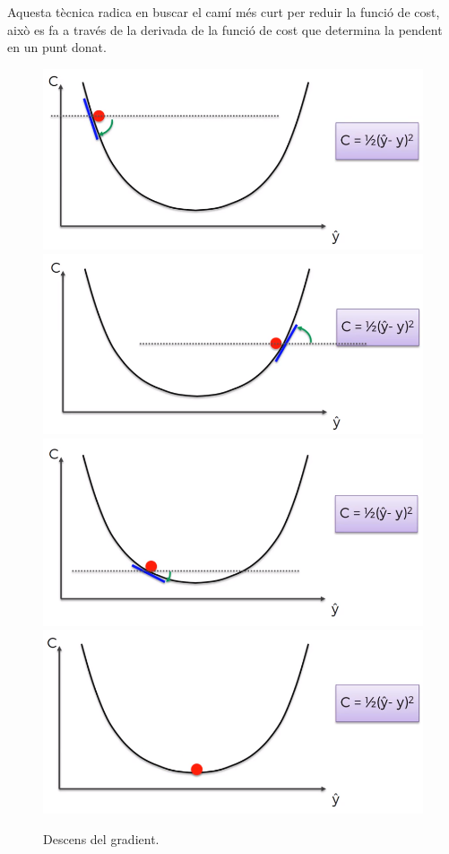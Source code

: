 \documentclass[12pt]{article}
\begin{document}
\\\\Aquesta tècnica radica en buscar el camí més curt per reduir la funció de cost, això es fa a través de la derivada de la funció de cost que determina la pendent en un punt donat.
\begin{figure}[h!]
	\includegraphics[scale=0.25]{imatges/dg/2dg2.png}
	\includegraphics[scale=0.25]{imatges/dg/3dg3.png}
	\includegraphics[scale=0.25]{imatges/dg/4dg4.png}
	\includegraphics[scale=0.25]{imatges/dg/5dg5.png}
	\caption{Descens del gradient.}
\end{figure}
\end{document}
